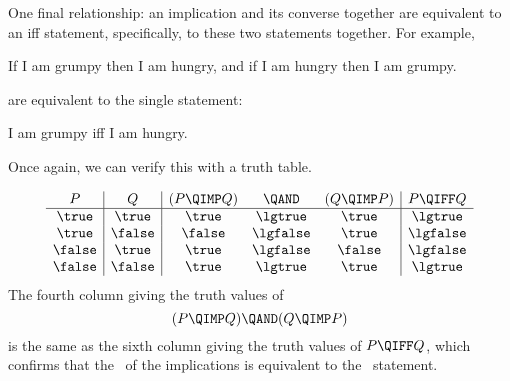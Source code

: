 One final relationship: an implication and its converse together are
equivalent to an iff statement, specifically, to these two statements
together.  For example,
\begin{center}
If I am grumpy then I am hungry, and if I am hungry then I am grumpy.
\end{center}
are equivalent to the single statement:
\begin{center}
I am grumpy iff I am hungry.
\end{center}
Once again, we can verify this with a truth table.  

\iffalse
We begin with a table with just the truth values of $P$ and $Q$:
\[
\begin{array}{c|c|ccc|c}
P & Q & (P \QIMP Q) &\QAND & (Q  \QIMP  P) & P \QIFF Q \\
\hline
\true  &  \true  &&&&\\
\true  &  \false &&&&\\
\false &  \true  &&&&\\
\false &  \false &&&&
\end{array}
\]
These truth values are enough to fill in three more columns:
\[
\begin{array}{c|c|ccc|c}
P & Q & (P \QIMP Q) &\QAND & (Q  \QIMP  P) & P \QIFF Q \\
\hline
\true  &  \true  &\true  &&\true & \lgtrue \\
\true  &  \false &\false &&\true & \lgfalse\\
\false &  \true  &\true  &&\false& \lgfalse\\
\false &  \false &\true  &&\true & \lgtrue 
\end{array}
\]
Finally, now using the first two of the filled in columns, we can fill in
the fourth column:
\fi

\[
\begin{array}{c|c|ccc|c}
P & Q & (P \QIMP Q) &\QAND & (Q  \QIMP  P) & P \QIFF Q \\
\hline
\true  &  \true  &\true  &\lgtrue &\true & \lgtrue \\
\true  &  \false &\false &\lgfalse&\true & \lgfalse\\
\false &  \true  &\true  &\lgfalse&\false& \lgfalse\\
\false &  \false &\true  &\lgtrue &\true & \lgtrue
\end{array}
\]
The fourth column giving the truth values of 
\[
(P \QIMP Q) \QAND (Q \QIMP P)
\]
is the same as the sixth column giving the truth values of $P \QIFF
Q$, which confirms that the \QAND\ of the implications is equivalent
to the \QIFF\ statement.

